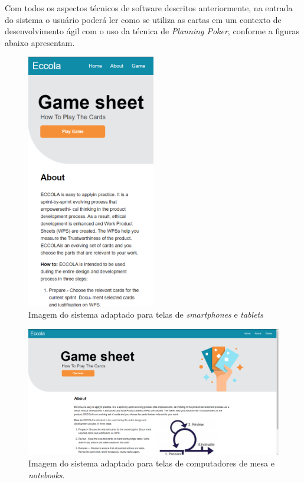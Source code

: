 Com todos os aspectos técnicos de software descritos anteriormente, na entrada do sistema o usuário poderá ler como se utiliza as cartas em um contexto de desenvolvimento ágil com o uso da técnica de \textit{Planning Poker}, conforme a figuras abaixo apresentam.

\begin{figure}[h!]
    \centering
    \includegraphics[width=0.5\textwidth]{img/eccola_celular.png}
    \caption{Imagem do sistema adaptado para telas de \textit{smartphones} e \textit{tablets}}
    \label{fig:eccola_celular}
\end{figure}

\begin{figure}[h!]
    \centering
    \includegraphics[width=\textwidth]{img/eccola_desktop.png}
    \caption{Imagem do sistema adaptado para telas de computadores de mesa e \textit{notebooks}.}
    \label{fig:eccola_desktop}
\end{figure}

